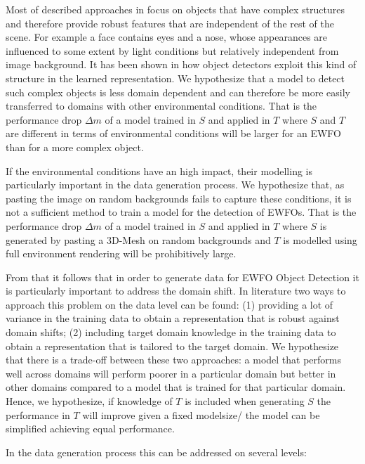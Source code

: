 Most of described approaches in  focus on objects that have complex structures and therefore provide robust features that are independent of the rest of the scene. For example a face contains eyes and a nose, whose appearances are influenced to some extent by light conditions but relatively independent from image background. It has been shown in  how object detectors exploit this kind of structure in the learned representation. We hypothesize that a model to detect such complex objects is less domain dependent and can therefore be more easily transferred to domains with other environmental conditions. That is the performance drop $\Delta m$ of a model trained in $S$ and applied in $T$ where $S$ and $T$ are different in terms of environmental conditions will be larger for an \ac{EWFO} than for a more complex object.

If the environmental conditions have an high impact, their modelling is particularly important in the data generation process. We hypothesize that, as pasting the image on random backgrounds fails to capture these conditions, it is not a sufficient method to train a model for the detection of \acp{EWFO}. That is the performance drop $\Delta m$ of a model trained in $S$ and applied in $T$ where $S$ is generated by pasting a 3D-Mesh on random backgrounds and $T$ is modelled using full environment rendering will be prohibitively large.
 
From that it follows that in order to generate data for \ac{EWFO} Object Detection it is particularly important to address the domain shift. In literature two ways to approach this problem on the data level can be found: (1) providing a lot of variance in the training data to obtain a representation that is robust against domain shifts; (2) including target domain knowledge in the training data to obtain a representation that is tailored to the target domain. We hypothesize that there is a trade-off between these two approaches: a model that performs well across domains will perform poorer in a particular domain but better in other domains compared to a model that is trained for that particular domain. Hence, we hypothesize, if knowledge of $T$ is included when generating $S$ the performance in $T$ will improve given a fixed modelsize/ the model can be simplified achieving equal performance. 

In the data generation process this can be addressed on several levels:

